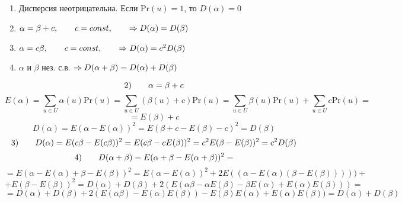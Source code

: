 \documentclass[discrete.tex]{subfiles}
\begin{document}
\begin{properties} [Дисперсии]
    \begin{enumerate}
        \item Дисперсия неотрицательна. Если Pr$(u) = 1$, то $D(\alpha) = 0$
        \item $\alpha = \beta + c, \qquad c = const, \qquad \Rightarrow D(\alpha) = D(\beta)$
        \item $\alpha = c\beta, \qquad c = const,  \qquad \Rightarrow D(\alpha) = c^2D(\beta)$
        \item $\alpha $ и $\beta$ нез. с.в.  $\Rightarrow D(\alpha + \beta) = D(\alpha) + 
            D(\beta)$
    \end{enumerate}
\end{properties}

\begin{Proof}
    \[2) \qquad \alpha = \beta + c\]
    \[E(\alpha) = \sum_{u \in U} \alpha(u) \text{Pr}(u) = 
    \sum_{u \in U} (\beta(u) + c) \text{Pr}(u) =  \sum_{u \in U}\beta(u)\text{Pr}(u) + 
        \sum_{u \in U}c \text{Pr}(u) =\]
    \[= E(\beta) + c\]
    \[D(\alpha) = E(\alpha - E(\alpha))^2 = E(\beta + c - E(\beta) - c)^2 = D(\beta)\]
    \[3) \qquad D(\alpha) = E(c\beta - E(c\beta))^2 = E(c\beta - cE(\beta))^2 = 
    c^2E(\beta - E(\beta))^2 = c^2 D(\beta)\]
    \[4) \qquad D(\alpha + \beta) = E(\alpha + \beta - E(\alpha + \beta))^2 = \]
    \[= E(\alpha - E(\alpha) + \beta - E(\beta))^2 = E(\alpha - E(\alpha))^2 + 
    2E((\alpha - E(\alpha)(\beta - E(\beta))))) + \]
    \[+ E(\beta - E(\beta))^2 = D(\alpha) + D(\beta) + 2(E(\alpha \beta - \alpha 
    E(\beta) - \beta E(\alpha) + E(\alpha)E(\beta))) =\]
    \[=  D(\alpha) + D(\beta) + 2(E(\alpha\beta) - E(\alpha)E(\beta)) - 
    E(\beta)E(\alpha) + E(\alpha)E(\beta)) = D(\alpha) + D(\beta)\]
\end{Proof}
\end{document}
